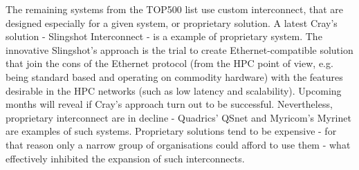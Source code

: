 \documentclass[magisterska,en]{pracamgr}
\begin{document}
The remaining systems from the TOP500 list use custom interconnect, that are designed especially for a given system, or proprietary solution. \cite{top500_list} A latest Cray's solution - Slingshot Interconnect - is a example of proprietary system. The innovative Slingshot's approach is the trial to create Ethernet-compatible solution that join the cons of the Ethernet protocol (from the HPC point of view, e.g. being standard based and operating on commodity hardware) with the features desirable in the HPC networks (such as low latency and scalability). \cite{slingshot_article} Upcoming months will reveal if Cray's approach turn out to be successful. Nevertheless, proprietary interconnect are in decline - Quadrics' QSnet and Myricom's Myrinet are examples of such systems. Proprietary solutions tend to be expensive - for that reason only a narrow group of organisations could afford to use them - what effectively inhibited the expansion of such interconnects.
\end{document}
